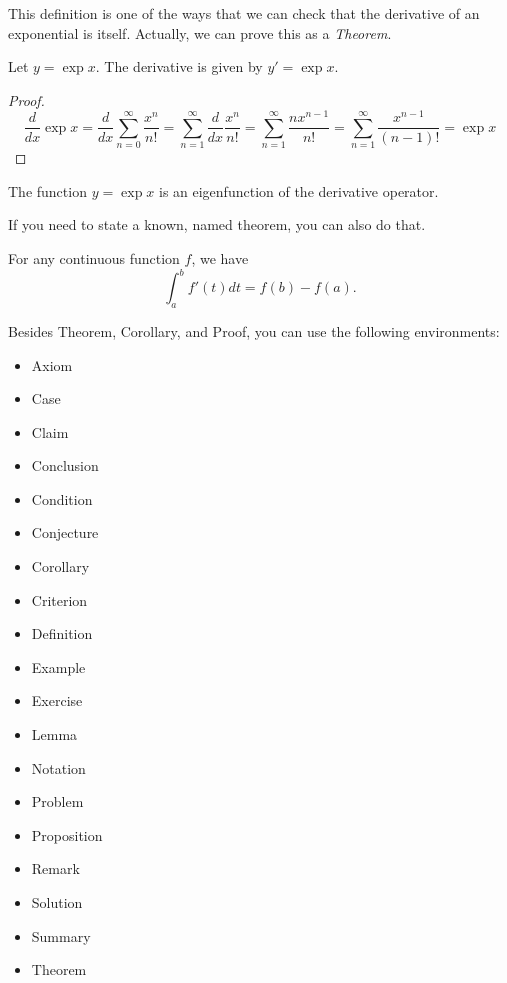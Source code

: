 \documentclass[12pt,reqno,twoside]{amsbook}
\begin{document}
This definition is one of the ways that we can check that the derivative of an exponential is itself. Actually, we can prove this as a \textit{Theorem}.

\begin{theorem}
    Let $y = \exp{x}$. The derivative is given by $y' = \exp{x}$.
\end{theorem}

\begin{proof}
\[
\frac{d}{dx} \exp{x} = \frac{d}{dx} \sum_{n=0}^{\infty} \frac{x^n}{n!} = \sum_{n=1}^{\infty} \frac{d}{dx} \frac{x^n}{n!} = \sum_{n=1}^{\infty}  \frac{n x^{n-1}}{n!} = \sum_{n=1}^{\infty}  \frac{x^{n-1}}{(n-1)!} = \exp{x}
\]
\end{proof}

\begin{corollary}
    The function $y=\exp{x}$ is an eigenfunction of the derivative operator.
\end{corollary}

\noindent If you need to state a known, named theorem, you can also do that.

\begin{theorem}
For any continuous function $f$, we have
    \[
    \int_{a}^{b} f'(t) dt = f(b) - f(a).
    \]
\end{theorem}

\noindent Besides Theorem, Corollary, and Proof, you can use the following environments:
\begin{itemize}
    \item Axiom
    \item Case
    \item Claim
    \item Conclusion
    \item Condition
    \item Conjecture
    \item Corollary
    \item Criterion
    \item Definition
    \item Example
    \item Exercise
    \item Lemma
    \item Notation
    \item Problem
    \item Proposition
    \item Remark
    \item Solution
    \item Summary
    \item Theorem
\end{itemize}
\end{document}
